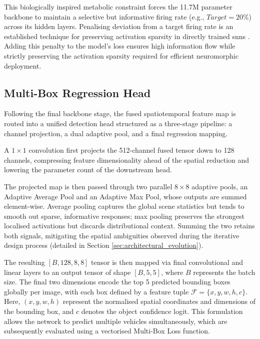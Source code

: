This biologically inspired metabolic constraint \cite{Roy2019SpikeBasedMI} forces the 11.7M parameter backbone to maintain a selective but informative firing rate (e.g., $Target = 20\%$) across its hidden layers. 
Penalising deviation from a target firing rate is an established technique for preserving activation sparsity in directly trained \glspl{snn} \cite{deng2021comprehensive,yan2022backpropagation}.
Adding this penalty to the model's loss ensures high information flow while strictly preserving the activation sparsity required for efficient neuromorphic deployment.

\subsection{Multi-Box Regression Head}
\label{subsec:snn_head}
Following the final backbone stage, the fused spatiotemporal feature map is routed into a unified detection head structured as a three-stage pipeline: a channel projection, a dual adaptive pool, and a final regression mapping.

A $1 \times 1$ convolution first projects the 512-channel fused tensor down to 128 channels, compressing feature dimensionality ahead of the spatial reduction and lowering the parameter count of the downstream head.

The projected map is then passed through two parallel $8 \times 8$ adaptive pools, an Adaptive Average Pool and an Adaptive Max Pool, whose outputs are summed element-wise. Average pooling captures the global scene statistics but tends to smooth out sparse, informative responses; max pooling preserves the strongest localised activations but discards distributional context. Summing the two retains both signals, mitigating the spatial ambiguities observed during the iterative design process (detailed in Section \ref{sec:architectural_evolution}).

The resulting $[B, 128, 8, 8]$ tensor is then mapped via final convolutional and linear layers to an output tensor of shape $[B, 5, 5]$, where $B$ represents the batch size.
The final two dimensions encode the top 5 predicted bounding boxes globally per image, with each box defined by a feature tuple $\mathcal{F} = \{x, y, w, h, c\}$.
Here, $(x, y, w, h)$ represent the normalised spatial coordinates and dimensions of the bounding box, and $c$ denotes the object confidence logit.
This formulation allows the network to predict multiple vehicles simultaneously, which are subsequently evaluated using a vectorised Multi-Box Loss function.

